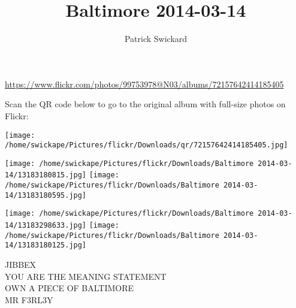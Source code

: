 \documentclass[10pt,letterpaper]{article}
\title{Baltimore 2014-03-14}
\author{Patrick Swickard}
\date{}
\begin{document}
\maketitle

\url{https://www.flickr.com/photos/99753978@N03/albums/72157642414185405}

Scan the QR code below to go to the original album with full-size photos on Flickr:

\texttt{[image: /home/swickape/Pictures/flickr/Downloads/qr/72157642414185405.jpg]}
\pagebreak

\texttt{[image: /home/swickape/Pictures/flickr/Downloads/Baltimore 2014-03-14/13183180815.jpg]}
\texttt{[image: /home/swickape/Pictures/flickr/Downloads/Baltimore 2014-03-14/13183180595.jpg]}

\texttt{[image: /home/swickape/Pictures/flickr/Downloads/Baltimore 2014-03-14/13183298633.jpg]}
\texttt{[image: /home/swickape/Pictures/flickr/Downloads/Baltimore 2014-03-14/13183180125.jpg]}

JIBBEX\\
YOU ARE THE MEANING STATEMENT\\
OWN A PIECE OF BALTIMORE\\
MR F3RL3Y
\pagebreak
\end{document}
